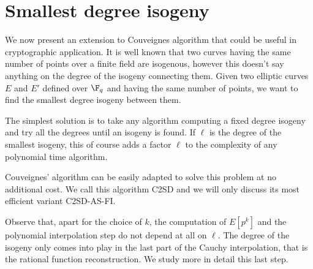 \section{Smallest degree isogeny}
\label{sec:bounded}

We now present an extension to Couveignes algorithm that could be
useful in cryptographic application. It is well known that two curves
having the same number of points over a finite field are isogenous,
however this doesn't say anything on the degree of the isogeny
connecting them. Given two elliptic curves $E$ and $E'$ defined over
$\F_q$ and having the same number of points, we want to find the
smallest degree isogeny between them.

The simplest solution is to take any algorithm computing a fixed
degree isogeny and try all the degrees until an isogeny is found. If
$\ell$ is the degree of the smallest isogeny, this of course adds a
factor $\ell$ to the complexity of any polynomial time algorithm.

Couveignes' algorithm can be easily adapted to solve this problem at
no additional cost. We call this algorithm C2SD and we will only
discuss its most efficient variant C2SD-AS-FI.

Observe that, apart for the choice of $k$, the computation of $E[p^k]$
and the polynomial interpolation step do not depend at all on
$\ell$. The degree of the isogeny only comes into play in the last
part of the Cauchy interpolation, that is the rational function
reconstruction. We study more in detail this last step.


